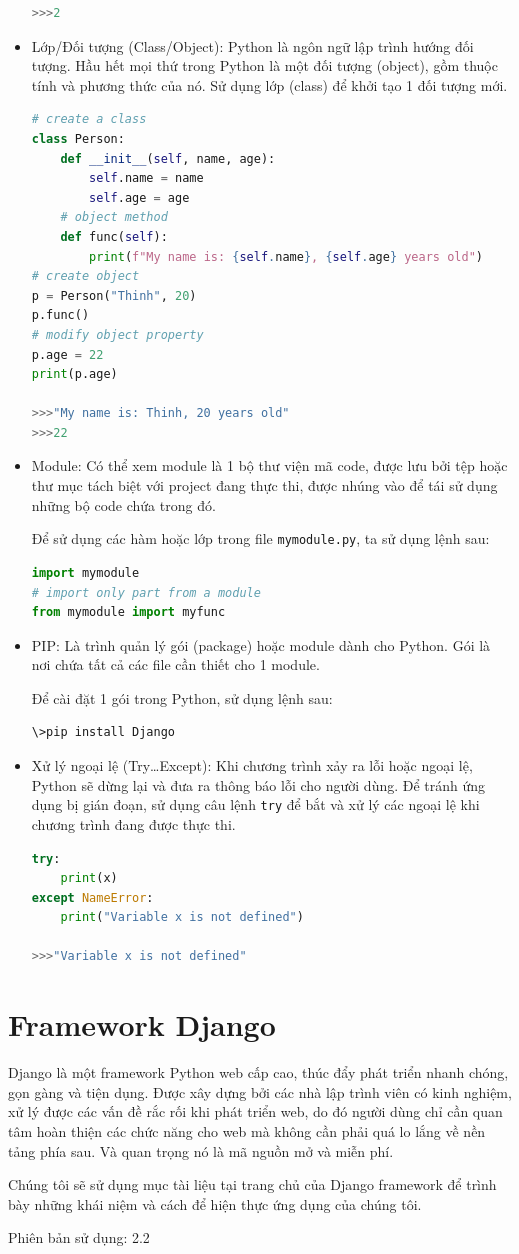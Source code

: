 \begin{itemize}
\begin{lstlisting}[language=Python]
>>>2
	\end{lstlisting}
	\item Lớp/Đối tượng (Class/Object): Python là ngôn ngữ lập trình hướng đối tượng. Hầu hết mọi thứ trong Python là một đối tượng (object), gồm thuộc tính và phương thức của nó. Sử dụng lớp (class) để khởi tạo 1 đối tượng mới.
	\begin{lstlisting}[language=Python]
# create a class
class Person:
	def __init__(self, name, age):
		self.name = name
		self.age = age
	# object method
	def func(self):
		print(f"My name is: {self.name}, {self.age} years old")
# create object
p = Person("Thinh", 20)
p.func()
# modify object property
p.age = 22
print(p.age)

>>>"My name is: Thinh, 20 years old"
>>>22
	\end{lstlisting}
	\item Module: Có thể xem module là 1 bộ thư viện mã code, được lưu bởi tệp hoặc thư mục tách biệt với project đang thực thi, được nhúng vào để tái sử dụng những bộ code chứa trong đó.
	\par
	Để sử dụng các hàm hoặc lớp trong file \texttt{mymodule.py}, ta sử dụng lệnh sau:
	\begin{lstlisting}[language=Python]
import mymodule
# import only part from a module
from mymodule import myfunc
	\end{lstlisting}
	\item PIP: Là trình quản lý gói (package) hoặc module dành cho Python. Gói là nơi chứa tất cả các file cần thiết cho 1 module.
	\par
	Để cài đặt 1 gói trong Python, sử dụng lệnh sau:
	\begin{lstlisting}[language=bash]
\>pip install Django
	\end{lstlisting}
	\item Xử lý ngoại lệ (Try\ldots Except): Khi chương trình xảy ra lỗi hoặc ngoại lệ, Python sẽ dừng lại và đưa ra thông báo lỗi cho người dùng. Để tránh ứng dụng bị gián đoạn, sử dụng câu lệnh \texttt{try} để bắt và xử lý các ngoại lệ khi chương trình đang được thực thi.
	\begin{lstlisting}[language=Python]
try:
	print(x)
except NameError:
	print("Variable x is not defined")
	
>>>"Variable x is not defined"
	\end{lstlisting}
\end{itemize}
\section{Framework Django}
Django là một framework Python web cấp cao, thúc đẩy phát triển nhanh chóng, gọn gàng và tiện dụng. Được xây dựng bởi các nhà lập trình viên có kinh nghiệm, xử lý được các vấn đề rắc rối khi phát triển web, do đó người dùng chỉ cần quan tâm hoàn thiện các chức năng cho web mà không cần phải quá lo lắng về nền tảng phía sau. Và quan trọng nó là mã nguồn mở và miễn phí.
\par
Chúng tôi sẽ sử dụng mục tài liệu\cite{django} tại trang chủ của Django framework để trình bày những khái niệm và cách để hiện thực ứng dụng của chúng tôi.
\par
Phiên bản sử dụng: 2.2
